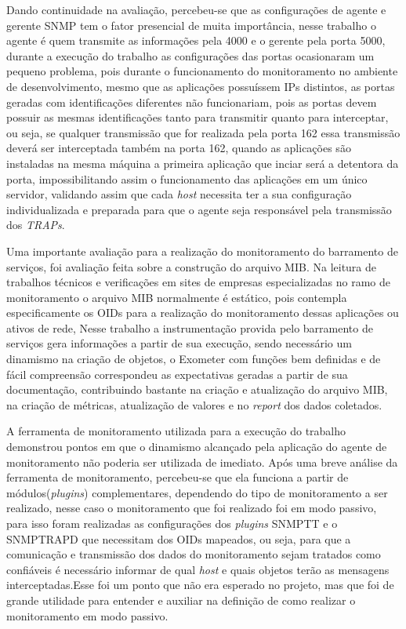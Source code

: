 Dando continuidade na avaliação, percebeu-se que as configurações de agente e gerente \acrshort{SNMP} tem o fator presencial de muita importância, nesse trabalho o agente é quem transmite as informações pela 4000 e o gerente pela porta 5000, durante a execução do trabalho as configurações das portas ocasionaram um pequeno problema, pois durante o funcionamento do monitoramento no ambiente de desenvolvimento, mesmo que as aplicações possuíssem \acrshort{IP}s distintos, as portas geradas com identificações diferentes não funcionariam, pois as portas devem possuir as mesmas identificações tanto para transmitir quanto para interceptar, ou seja, se qualquer transmissão que for realizada pela porta 162 essa transmissão deverá ser interceptada também na porta 162, quando as aplicações são instaladas na mesma máquina a primeira aplicação que inciar será a detentora da porta, impossibilitando assim o funcionamento das aplicações em um único servidor, validando assim que cada \textit{host} necessita ter a sua configuração individualizada e preparada para que o agente seja responsável pela transmissão dos \textit{TRAPs}. 

Uma importante avaliação para a realização do monitoramento do barramento de serviços, foi avaliação feita sobre a construção do arquivo MIB. Na leitura de trabalhos técnicos e verificações em sites de empresas especializadas no ramo de monitoramento o arquivo MIB normalmente é estático, pois contempla especificamente os \acrshort{OID}s para a realização do monitoramento dessas aplicações ou ativos de rede, Nesse trabalho a instrumentação provida pelo barramento de serviços gera informações a partir de sua execução, sendo necessário um dinamismo na criação de objetos, o Exometer com funções bem definidas e de fácil compreensão correspondeu as expectativas geradas a partir de sua documentação, contribuindo bastante na criação e atualização do arquivo MIB, na criação de métricas, atualização de valores e no \textit{report} dos dados coletados.  

A ferramenta de monitoramento utilizada para a execução do trabalho demonstrou pontos em que o dinamismo alcançado pela aplicação do agente de monitoramento não poderia ser utilizada de imediato. Após uma breve análise da ferramenta de monitoramento, percebeu-se que ela funciona a partir de módulos(\textit{plugins}) complementares, dependendo do tipo de monitoramento a ser realizado, nesse caso o monitoramento que foi realizado foi em modo passivo, para isso foram realizadas as configurações dos \textit{plugins} \acrshort{SNMPTT} e o SNMPTRAPD que necessitam dos \acrshort{OID}s mapeados, ou seja, para que a comunicação e transmissão dos dados do monitoramento sejam tratados como confiáveis é necessário informar de qual \textit{host} e quais objetos terão as mensagens interceptadas.Esse foi um ponto que não era esperado no projeto, mas que foi de grande utilidade para entender e auxiliar na definição de como realizar o monitoramento em modo passivo.   

